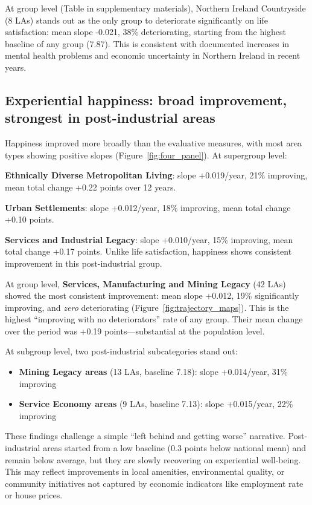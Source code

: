 \documentclass[12pt,a4paper]{article}
\begin{document}
At group level (Table in supplementary materials), Northern Ireland Countryside (8 LAs) stands out as the only group to deteriorate significantly on life satisfaction: mean slope -0.021, 38\% deteriorating, starting from the highest baseline of any group (7.87). This is consistent with documented increases in mental health problems and economic uncertainty in Northern Ireland in recent years.

\subsection{Experiential happiness: broad improvement, strongest in post-industrial areas}

Happiness improved more broadly than the evaluative measures, with most area types showing positive slopes (Figure~\ref{fig:four_panel}). At supergroup level:

\textbf{Ethnically Diverse Metropolitan Living}: slope +0.019/year, 21\% improving, mean total change +0.22 points over 12 years.

\textbf{Urban Settlements}: slope +0.012/year, 18\% improving, mean total change +0.10 points.

\textbf{Services and Industrial Legacy}: slope +0.010/year, 15\% improving, mean total change +0.17 points. Unlike life satisfaction, happiness shows consistent improvement in this post-industrial group.

At group level, \textbf{Services, Manufacturing and Mining Legacy} (42 LAs) showed the most consistent improvement: mean slope +0.012, 19\% significantly improving, and \textit{zero} deteriorating (Figure~\ref{fig:trajectory_maps}). This is the highest ``improving with no deteriorators'' rate of any group. Their mean change over the period was +0.19 points---substantial at the population level.

At subgroup level, two post-industrial subcategories stand out:
\begin{itemize}
\item \textbf{Mining Legacy areas} (13 LAs, baseline 7.18): slope +0.014/year, 31\% improving
\item \textbf{Service Economy areas} (9 LAs, baseline 7.13): slope +0.015/year, 22\% improving
\end{itemize}

These findings challenge a simple ``left behind and getting worse'' narrative. Post-industrial areas started from a low baseline (0.3 points below national mean) and remain below average, but they are slowly recovering on experiential well-being. This may reflect improvements in local amenities, environmental quality, or community initiatives not captured by economic indicators like employment rate or house prices.
\end{document}
